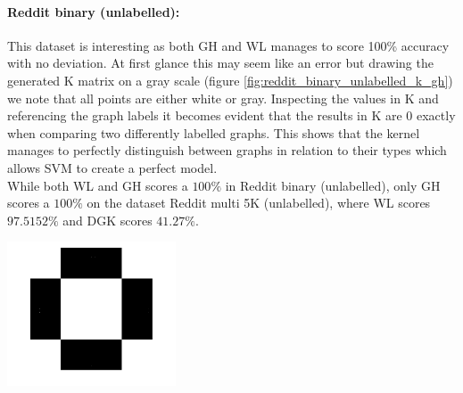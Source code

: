 \documentclass{article}
\begin{document}
\begin{minipage}{0.6\linewidth}
	\paragraph{Reddit binary (unlabelled):} This dataset is interesting as both GH and WL manages to score 100\% accuracy with no deviation. At first glance this may seem like an error but drawing the generated K matrix on a gray scale (figure \ref{fig:reddit_binary_unlabelled_k_gh}) we note that all points are either white or gray. Inspecting the values in K and referencing the graph labels it becomes evident that the results in K are 0 exactly when comparing two differently labelled graphs. This shows that the kernel manages to perfectly distinguish between graphs in relation to their types which allows SVM to create a perfect model.\\
While both WL and GH scores a $100\%$ in Reddit binary (unlabelled), only GH scores a $100\%$ on the dataset Reddit multi 5K (unlabelled), where WL scores $97.5152\%$ and DGK scores $41.27\%$.
\end{minipage}
\hspace*{0.2in}
\begin{minipage}{0.5\linewidth}
	\includegraphics[width=5cm]{reddit_trolls_k}
	\label{fig:reddit_binary_unlabelled_k_gh}
\end{minipage}
\end{document}

